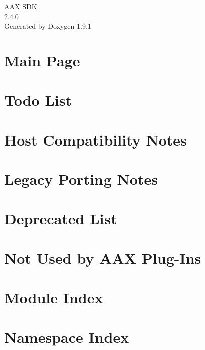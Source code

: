 \let\mypdfximage\pdfximage\def\pdfximage{\immediate\mypdfximage}\documentclass[twoside]{book}
\newcommand{\+}{\discretionary{\mbox{\scriptsize$\hookleftarrow$}}{}{}}
\newcommand{\clearemptydoublepage}{%
  \newpage{\pagestyle{empty}\cleardoublepage}%
}
\begin{document}
\raggedbottom

\hypersetup{pageanchor=false,
             bookmarksnumbered=true,
             pdfencoding=unicode
            }
\begin{titlepage}
\vspace*{7cm}
\begin{center}%
{\Large AAX SDK \\[1ex]\large 2.\+4.\+0 }\\
\vspace*{1cm}
{\large Generated by Doxygen 1.9.1}\\
\end{center}
\end{titlepage}
\clearemptydoublepage
{}
\tableofcontents
\clearemptydoublepage
{}
\hypersetup{pageanchor=true}

\chapter{Main Page}
\label{index}\hypertarget{index}{}
\chapter{Todo List}
\label{a00800}

\chapter{Host Compatibility Notes}
\label{a00801}

\chapter{Legacy Porting Notes}
\label{a00802}

\chapter{Deprecated List}
\label{a00803}

\chapter{Not Used by AAX Plug-\/\+Ins}
\label{a00804}

\chapter{Module Index}

\chapter{Namespace Index}

\end{document}
